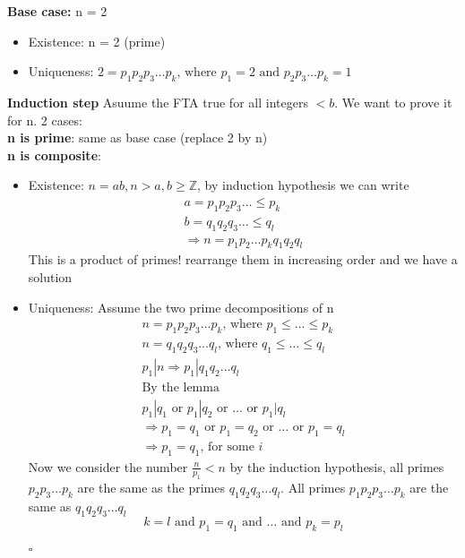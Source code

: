 \documentclass{article}
\begin{document}
\textbf{Base case:} n = 2
\begin{itemize}
    \item Existence: n = 2 (prime)
    \item Uniqueness: $2 =
              p_1  p_2  p_3 \dots  p_k \text{, where }
              p_1 = 2 \text{ and }  p_2  p_3 \dots  p_k = 1$
\end{itemize}
\textbf{Induction step}
Asuume the FTA true for all integers $< b$. We want to prove it for n.
2 cases:
\\
\textbf{ n is prime}: same as base case (replace 2 by n)\\
\textbf{ n is composite}:
\begin{itemize}
    \item Existence: $n = ab, n > a,b \ge \mathbb{Z} $, by induction hypothesis we can write
          \begin{gather*}
              a =p_1  p_2  p_3 \dots  \le p_k \\
              b = q_1  q_2  q_3 \dots \le q_l \\
              \Rightarrow  n = p_1p_2 \dots p_kq_1q_2 q_l
          \end{gather*}
          This is a product of primes! rearrange them in  increasing order and we have a solution
    \item Uniqueness: Assume the two prime decompositions of n
          \begin{gather*}
              n =p_1  p_2  p_3 \dots p_k \text{, where } p_1 \le \dots  \le p_k \\
              n =q_1  q_2  q_3 \dots q_l \text{, where } q_1 \le \dots  \le q_l \\
              p_1 | n \Rightarrow p_1|q_1q_2 \dots q_l \\
              \text{By the lemma}\\
              p_1|q_1 \text{ or } p_1|q_2 \text{ or } \dots \text{ or } p_1|q_l \\
              \Rightarrow p_1=q_1 \text{ or } p_1=q_2 \text{ or } \dots \text{ or } p_1=q_l \\
              \Rightarrow p_1=q_1 \text{, for some } i
          \end{gather*}
          Now we consider the number $\frac{n}{p_1} < n$ by the induction hypothesis, all primes $p_2  p_3 \dots  p_k$ are the same as the primes $q_1  q_2  q_3 \dots  q_l$. All primes $p_1 p_2  p_3 \dots  p_k$ are the same as $q_1  q_2  q_3 \dots  q_l$
          \[
              k=l \text{ and } p_1 = q _{1} \text{ and } \dots \text{ and } p_k = p_l
          \]
          \\
          \hspace*{\fill} $\square$
\end{itemize}
\end{document}
